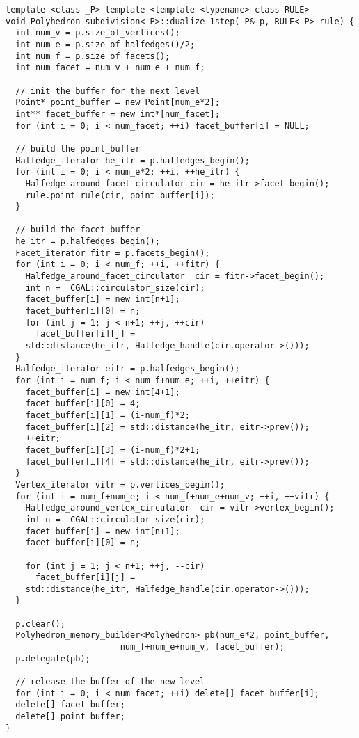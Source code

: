\begin{lstlisting}
template <class _P> template <template <typename> class RULE>
void Polyhedron_subdivision<_P>::dualize_1step(_P& p, RULE<_P> rule) {
  int num_v = p.size_of_vertices();
  int num_e = p.size_of_halfedges()/2;
  int num_f = p.size_of_facets();
  int num_facet = num_v + num_e + num_f;
  
  // init the buffer for the next level
  Point* point_buffer = new Point[num_e*2];
  int** facet_buffer = new int*[num_facet];
  for (int i = 0; i < num_facet; ++i) facet_buffer[i] = NULL;

  // build the point_buffer
  Halfedge_iterator he_itr = p.halfedges_begin(); 
  for (int i = 0; i < num_e*2; ++i, ++he_itr) {
    Halfedge_around_facet_circulator cir = he_itr->facet_begin();
    rule.point_rule(cir, point_buffer[i]);
  }

  // build the facet_buffer
  he_itr = p.halfedges_begin(); 
  Facet_iterator fitr = p.facets_begin();  
  for (int i = 0; i < num_f; ++i, ++fitr) {
    Halfedge_around_facet_circulator  cir = fitr->facet_begin();
    int n =  CGAL::circulator_size(cir); 
    facet_buffer[i] = new int[n+1];
    facet_buffer[i][0] = n;
    for (int j = 1; j < n+1; ++j, ++cir)
      facet_buffer[i][j] = 
	std::distance(he_itr, Halfedge_handle(cir.operator->())); 
  }
  Halfedge_iterator eitr = p.halfedges_begin();
  for (int i = num_f; i < num_f+num_e; ++i, ++eitr) {
    facet_buffer[i] = new int[4+1];
    facet_buffer[i][0] = 4;
    facet_buffer[i][1] = (i-num_f)*2;
    facet_buffer[i][2] = std::distance(he_itr, eitr->prev());    
    ++eitr;
    facet_buffer[i][3] = (i-num_f)*2+1; 
    facet_buffer[i][4] = std::distance(he_itr, eitr->prev());    
  }
  Vertex_iterator vitr = p.vertices_begin();
  for (int i = num_f+num_e; i < num_f+num_e+num_v; ++i, ++vitr) {
    Halfedge_around_vertex_circulator  cir = vitr->vertex_begin();
    int n =  CGAL::circulator_size(cir); 
    facet_buffer[i] = new int[n+1];
    facet_buffer[i][0] = n;

    for (int j = 1; j < n+1; ++j, --cir)
      facet_buffer[i][j] = 
	std::distance(he_itr, Halfedge_handle(cir.operator->())); 
  }
  
  p.clear();
  Polyhedron_memory_builder<Polyhedron> pb(num_e*2, point_buffer, 
					   num_f+num_e+num_v, facet_buffer);
  p.delegate(pb);
  
  // release the buffer of the new level
  for (int i = 0; i < num_facet; ++i) delete[] facet_buffer[i];
  delete[] facet_buffer;
  delete[] point_buffer;
}
\end{lstlisting}


